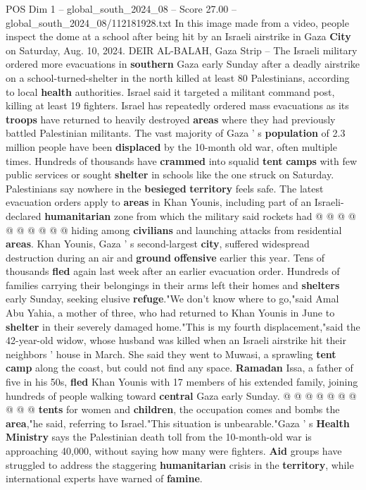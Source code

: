 \begin{textsample}{POS Dim 1 – global\_south\_2024\_08 – Score 27.00 – global\_south\_2024\_08/112181928.txt}  \label{ex:f1_pos_326}
In this image made from a video, people inspect the dome at a school after being hit by an Israeli airstrike in Gaza \textbf{City} on Saturday, Aug. 10, 2024.
DEIR AL-BALAH, Gaza Strip -- The Israeli military ordered more evacuations in \textbf{southern} Gaza early Sunday after a deadly airstrike on a school-turned-shelter in the north killed at least 80 Palestinians, according to local \textbf{health} authorities.
Israel said it targeted a militant command post, killing at least 19 fighters.
Israel has repeatedly ordered mass evacuations as its \textbf{troops} have returned to heavily destroyed \textbf{areas} where they had previously battled Palestinian militants.
The vast majority of Gaza ' s \textbf{population} of 2.3 million people have been \textbf{displaced} by the 10-month old war, often multiple times.
Hundreds of thousands have \textbf{crammed} into squalid \textbf{tent} \textbf{camps} with few public services or sought \textbf{shelter} in schools like the one struck on Saturday.
Palestinians say nowhere in the \textbf{besieged} \textbf{territory} feels safe.
The latest evacuation orders apply to \textbf{areas} in Khan Younis, including part of an Israeli-declared \textbf{humanitarian} zone from which the military said rockets had @ @ @ @ @ @ @ @ @ @ hiding among \textbf{civilians} and launching attacks from residential \textbf{areas}.
Khan Younis, Gaza ' s second-largest \textbf{city}, suffered widespread destruction during an air and \textbf{ground} \textbf{offensive} earlier this year.
Tens of thousands \textbf{fled} again last week after an earlier evacuation order.
Hundreds of families carrying their belongings in their arms left their homes and \textbf{shelters} early Sunday, seeking elusive \textbf{refuge}."We don't know where to go,"said Amal Abu Yahia, a mother of three, who had returned to Khan Younis in June to \textbf{shelter} in their severely damaged home."This is my fourth displacement,"said the 42-year-old widow, whose husband was killed when an Israeli airstrike hit their neighbors ' house in March.
She said they went to Muwasi, a sprawling \textbf{tent} \textbf{camp} along the coast, but could not find any space. \textbf{Ramadan} Issa, a father of five in his 50s, \textbf{fled} Khan Younis with 17 members of his extended family, joining hundreds of people walking toward \textbf{central} Gaza early Sunday. @ @ @ @ @ @ @ @ @ @ \textbf{tents} for women and \textbf{children}, the occupation comes and bombs the \textbf{area},"he said, referring to Israel."This situation is unbearable."Gaza ' s \textbf{Health} \textbf{Ministry} says the Palestinian death toll from the 10-month-old war is approaching 40,000, without saying how many were fighters. \textbf{Aid} groups have struggled to address the staggering \textbf{humanitarian} crisis in the \textbf{territory}, while international experts have warned of \textbf{famine}.

\end{textsample}
